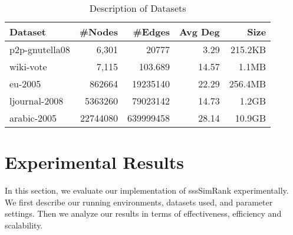 \documentclass[conference]{IEEEtran}
\theoremstyle{definition}
\theoremstyle{definition}
\begin{document}
\begin{table}[h]
\renewcommand{\arraystretch}{1.3}
\caption{Description of Datasets}
\label{tab:one}
\centering
\begin{tabular}{|l|r|r|r|r|}
\hline
\textbf{Dataset} & \textbf{\#Nodes} & \textbf{\#Edges} & \textbf{Avg Deg} & \textbf{Size} \\
\hline
p2p-gnutella08 \footnotemark[1]  & {6,301}         & \num{20777}                   & 3.29                & 215.2KB\\
\hline
wiki-vote \footnotemark[2]    & 7,115 	& \num{103,689}                           &14.57                & 1.1MB  \\
\hline
eu-2005       \footnotemark[3]     & \num{862664}  & \num{19235140 }          & 22.29             & 256.4MB\\
\hline
ljournal-2008  \footnotemark[4] & \num{5363260} & \num{79023142}         & 14.73            &1.2GB\\
\hline
arabic-2005 \footnotemark[5]   & \num{22744080} & \num{639999458}      & 28.14           & 10.9GB\\
\hline
\end{tabular}
\end{table}
\section{Experimental Results}
In this section, we evaluate our implementation of  sssSimRank experimentally.
We first describe our running environments, datasets used, and parameter settings.
Then we analyze our results in terms of effectiveness, efficiency and scalability.%
\end{document}
